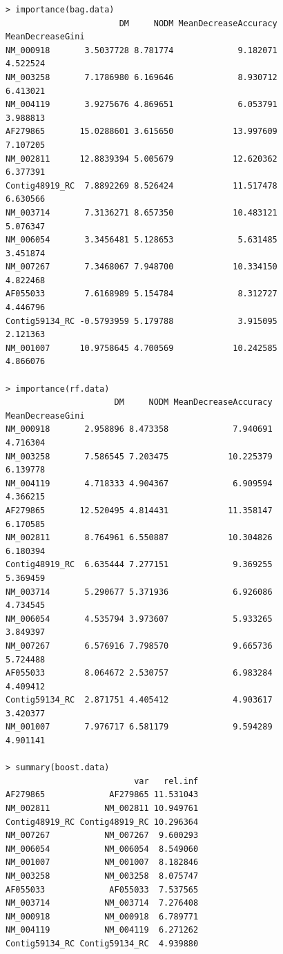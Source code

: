 \documentclass[11pt, a4paper]{article}
\begin{document}
\begin{verbatim}
> importance(bag.data)
                       DM     NODM MeanDecreaseAccuracy MeanDecreaseGini
NM_000918       3.5037728 8.781774             9.182071         4.522524
NM_003258       7.1786980 6.169646             8.930712         6.413021
NM_004119       3.9275676 4.869651             6.053791         3.988813
AF279865       15.0288601 3.615650            13.997609         7.107205
NM_002811      12.8839394 5.005679            12.620362         6.377391
Contig48919_RC  7.8892269 8.526424            11.517478         6.630566
NM_003714       7.3136271 8.657350            10.483121         5.076347
NM_006054       3.3456481 5.128653             5.631485         3.451874
NM_007267       7.3468067 7.948700            10.334150         4.822468
AF055033        7.6168989 5.154784             8.312727         4.446796
Contig59134_RC -0.5793959 5.179788             3.915095         2.121363
NM_001007      10.9758645 4.700569            10.242585         4.866076

> importance(rf.data)
                      DM     NODM MeanDecreaseAccuracy MeanDecreaseGini
NM_000918       2.958896 8.473358             7.940691         4.716304
NM_003258       7.586545 7.203475            10.225379         6.139778
NM_004119       4.718333 4.904367             6.909594         4.366215
AF279865       12.520495 4.814431            11.358147         6.170585
NM_002811       8.764961 6.550887            10.304826         6.180394
Contig48919_RC  6.635444 7.277151             9.369255         5.369459
NM_003714       5.290677 5.371936             6.926086         4.734545
NM_006054       4.535794 3.973607             5.933265         3.849397
NM_007267       6.576916 7.798570             9.665736         5.724488
AF055033        8.064672 2.530757             6.983284         4.409412
Contig59134_RC  2.871751 4.405412             4.903617         3.420377
NM_001007       7.976717 6.581179             9.594289         4.901141

> summary(boost.data)
                          var   rel.inf
AF279865             AF279865 11.531043
NM_002811           NM_002811 10.949761
Contig48919_RC Contig48919_RC 10.296364
NM_007267           NM_007267  9.600293
NM_006054           NM_006054  8.549060
NM_001007           NM_001007  8.182846
NM_003258           NM_003258  8.075747
AF055033             AF055033  7.537565
NM_003714           NM_003714  7.276408
NM_000918           NM_000918  6.789771
NM_004119           NM_004119  6.271262
Contig59134_RC Contig59134_RC  4.939880
\end{verbatim}
\end{document}
